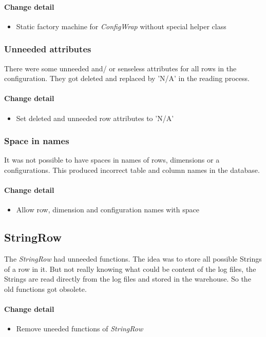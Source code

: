 \paragraph{Change detail}
\begin{itemize}
  \item Static factory machine for \textit{ConfigWrap} without special helper class
\end{itemize}

\subsubsection{Unneeded attributes}
There were some unneeded and/ or senseless attributes for all rows in the configuration.
They got deleted and replaced by 'N/A' in the reading process.

\paragraph{Change detail}
\begin{itemize}
  \item Set deleted and unneeded row attributes to 'N/A'
\end{itemize}

\subsubsection{Space in names}
It was not possible to have spaces in names of rows, dimensions or a configurations. This
produced incorrect table and column names in the database.
\paragraph{Change detail}
\begin{itemize}
  \item Allow row, dimension and configuration names with space
\end{itemize}

\subsection{StringRow}
The \textit{StringRow} had unneeded functions. The idea was
to store all possible Strings of a row in it. But not really knowing what
could be content of the log files, the Strings are read directly from 
the log files and stored in the warehouse. So the old functions got obsolete.

\paragraph{Change detail}
\begin{itemize}
  \item Remove uneeded functions of \textit{StringRow} %
\end{itemize}

